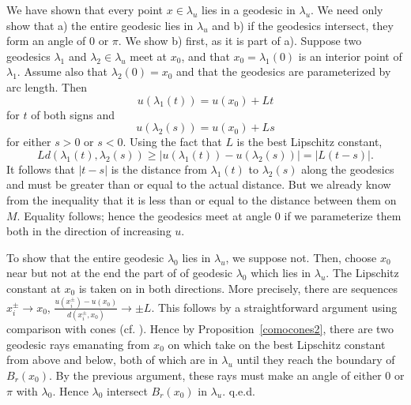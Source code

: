 \documentclass{ip-journal}
\theoremstyle{definition}
\newenvironment{straightline} 
{{\sc Proof of Theorem~\ref{straightline}.}}
{{\sc q.e.d.} \\}
\numberwithin{equation}{section}
\begin{document}
\begin{straightline} We have shown that every point $x \in \lambda_u$ lies in a geodesic in $\lambda_u.$ We need only show that a) the entire geodesic lies in $\lambda_u$ and b) if the geodesics intersect, they form an angle of 0 or $\pi$.  We show b) first, as it is part of a). Suppose two geodesics $\lambda_1$ and $\lambda_2 \in \lambda_u$ meet at $x_0$, and that $x_0 = \lambda_1(0)$ is an interior point of $ \lambda_1.$ Assume also that $\lambda_2(0) = x_0$ and that the geodesics are parameterized by arc length.  Then
\[ 
u(\lambda_1(t)) = u(x_0) + Lt
\]
 for $t$ of both signs and 
 \[
 u(\lambda_2(s)) = u(x_0) + Ls
 \]
  for either $s > 0$ or $s < 0.$ Using the fact that $ L$ is the best Lipschitz constant, 
  \[ 
  Ld (\lambda_1 (t), \lambda_2(s)) \geq
 |u(\lambda_1(t)) - u(\lambda_2(s))| = |L(t - s)|. 
  \] 
It follows that  $|t-s|$ is the distance from $\lambda_1(t)$ to $\lambda_2(s)$ along the geodesics and must be greater than or equal to the actual distance. But we already know from the inequality that it is less than or equal to the distance between them on $M$. Equality follows; hence the geodesics meet at angle 0 if we parameterize them both in the direction of increasing $u.$

To show that the entire geodesic $\lambda_0$ lies in $\lambda_u$, we suppose not.  Then, choose $x_0$ near but not at the end the part of of geodesic $\lambda_0$ which lies in $\lambda_u.$  The Lipschitz constant at $x_0$ is taken on in both directions. More precisely, there are sequences 
$ x_i^\pm \rightarrow x_0$, 
$ \frac{u(x_i^\pm)-u(x_0)}{d(x_i^\pm,x_0)} \rightarrow \pm L .$ This follows by a straightforward argument using comparison with cones (cf. \cite[Lemma 4.6]{crandal}).
Hence by Proposition~\ref{comocones2}, there are two geodesic rays emanating from $x_0$ on which take on the best Lipschitz constant from above and below, both of  which are in $\lambda_u$ until they reach the boundary of $B_r(x_0).$  By the previous argument, these rays must make an angle of either 0 or $\pi $ with $\lambda_0.$ Hence $\lambda_0$ intersect $B_r(x_0)$ in $\lambda_u.$
\end{straightline}
\end{document}
